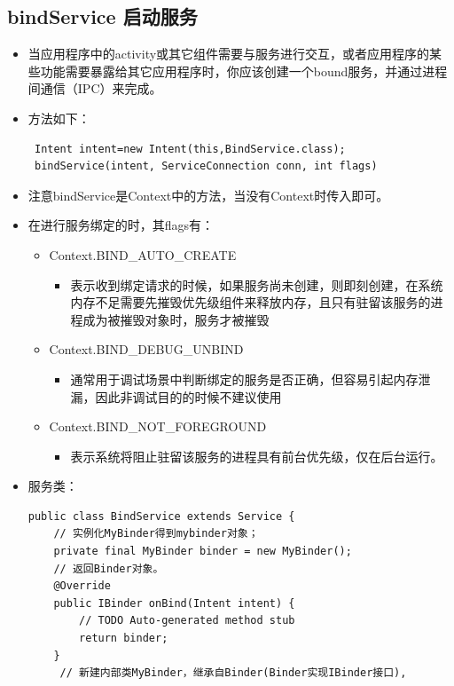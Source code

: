 \documentclass[9pt, b5paper]{article}
\begin{document}
\subsection{bindService 启动服务　　}
\label{sec-3-7}
\begin{itemize}
\item 当应用程序中的activity或其它组件需要与服务进行交互，或者应用程序的某些功能需要暴露给其它应用程序时，你应该创建一个bound服务，并通过进程间通信（IPC）来完成。
\item 方法如下：
\begin{verbatim}
 Intent intent=new Intent(this,BindService.class); 
 bindService(intent, ServiceConnection conn, int flags)
\end{verbatim}
\item 注意bindService是Context中的方法，当没有Context时传入即可。
\item 在进行服务绑定的时，其flags有：
\begin{itemize}
\item Context.BIND\_AUTO\_CREATE    
\begin{itemize}
\item 表示收到绑定请求的时候，如果服务尚未创建，则即刻创建，在系统内存不足需要先摧毁优先级组件来释放内存，且只有驻留该服务的进程成为被摧毁对象时，服务才被摧毁　
\end{itemize}
\item Context.BIND\_DEBUG\_UNBIND    　
\begin{itemize}
\item 通常用于调试场景中判断绑定的服务是否正确，但容易引起内存泄漏，因此非调试目的的时候不建议使用
\end{itemize}
\item Context.BIND\_NOT\_FOREGROUND    　
\begin{itemize}
\item 表示系统将阻止驻留该服务的进程具有前台优先级，仅在后台运行。
\end{itemize}
\end{itemize}
\item 服务类：
\begin{verbatim}
public class BindService extends Service {
    // 实例化MyBinder得到mybinder对象；
    private final MyBinder binder = new MyBinder();
    // 返回Binder对象。
    @Override
    public IBinder onBind(Intent intent) {
        // TODO Auto-generated method stub
        return binder;
    }
     // 新建内部类MyBinder，继承自Binder(Binder实现IBinder接口),

\end{verbatim}
\end{itemize}
\end{document}
